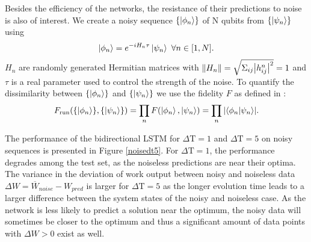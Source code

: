 Besides the efficiency of the networks, the resistance of their predictions to noise is also of interest.
We create a noisy sequence $\{\ket{\phi_n}\}$ of N qubits from $\{\ket{\psi_n}\}$ using
\begin{align*}
	\ket{\phi_n} = e^{-i H_n \tau} \ket{\psi_n} \ \forall n \in [1, N].
\end{align*}
$H_n$ are randomly generated Hermitian matrices with $\norm{H_n} = \sqrt{\Sigma_{ij} \abs{h^n_{ij}}^2} = 1$ and $\tau$ is a real parameter used to control the strength of the noise.
To quantify the dissimilarity between $\{\ket{\phi_n}\}$ and $\{\ket{\psi_n}\}$ we use the fidelity $F$ as defined in \cite{10.5555/1972505}:
\begin{align*}
	F_{\text{run}}(\{\ket{\phi_n}\}, \{\ket{\psi_n}\}) = \prod_n F(\ket{\phi_n}, \ket{\psi_n}) = \prod_n \abs{\bra{\phi_n}\ket{\psi_n}}.
\end{align*}

The performance of the bidirectional LSTM for $\Delta \mathrm{T} = 1$ and $\Delta \mathrm{T} = 5$ on noisy sequences is presented in Figure \ref{noisedt5}.
For $\Delta \mathrm{T} = 1$, the performance degrades among the test set, as the noiseless predictions are near their optima.
The variance in the deviation of work output between noisy and noiseless data $\Delta W = \overline{W}_{noise} - W_{pred}$ is larger for $\Delta \mathrm{T} = 5$ as the longer evolution time leads to a larger difference between the system states of the noisy and noiseless case.
As the network is less likely to predict a solution near the optimum, the noisy data will sometimes be closer to the optimum and thus a significant amount of data points with $\Delta W > 0$ exist as well.

